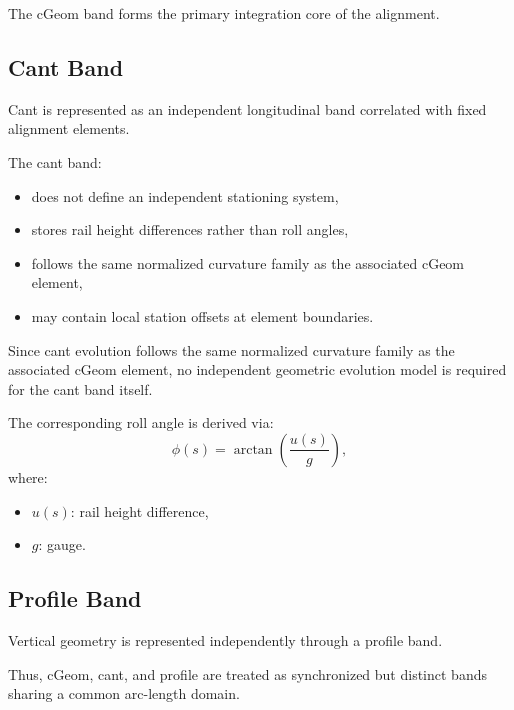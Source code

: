 The cGeom band forms the primary integration core of the alignment.

\subsection{Cant Band}

\begin{definition}
Cant is represented as an independent longitudinal band correlated with
fixed alignment elements.
\end{definition}

The cant band:
\begin{itemize}
\item does not define an independent stationing system,
\item stores rail height differences rather than roll angles,
\item follows the same normalized curvature family as the associated
cGeom element,
\item may contain local station offsets at element boundaries.
\end{itemize}

Since cant evolution follows the same normalized curvature family as
the associated cGeom element, no independent geometric evolution model
is required for the cant band itself.

The corresponding roll angle is derived via:
\[
\phi(s)
=
\arctan\!\left(
\frac{u(s)}{g}
\right),
\]
where:
\begin{itemize}
\item \(u(s)\): rail height difference,
\item \(g\): gauge.
\end{itemize}

\subsection{Profile Band}

\begin{definition}
Vertical geometry is represented independently through a profile band.
\end{definition}

Thus, cGeom, cant, and profile are treated as synchronized but distinct
bands sharing a common arc-length domain.

